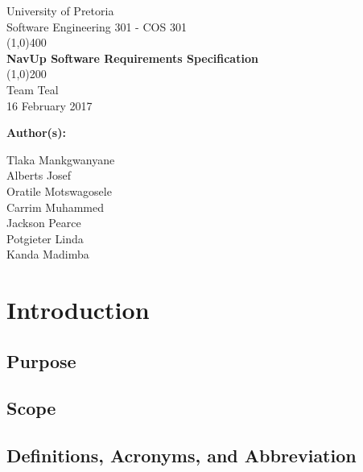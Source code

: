 \documentclass[12pt, a4paper]{article}
\begin{document}
\begin{titlepage}
	\begin{center}
	\huge{University of Pretoria\\
	Software Engineering 301 - COS 301}\\
	\line(1,0){400}\\
	\huge{\bfseries NavUp Software Requirements Specification}\\
	\line(1,0){200}\\
	Team Teal\\
	16 February 2017\\
	[3cm]
	\end{center}
	\begin{flushleft}
	\bfseries{Author(s):}
	\end{flushleft}
	\begin{flushleft}
	Tlaka Mankgwanyane	\\
	Alberts Josef			\\
	Oratile Motswagosele	\\
	Carrim Muhammed		\\
	Jackson Pearce			\\
	Potgieter Linda		\\
	Kanda Madimba			\\
	\end{flushleft}
\end{titlepage}

\tableofcontents

\section{Introduction}
	\subsection{Purpose}
	\subsection{Scope}
	\subsection{Definitions, Acronyms, and Abbreviation}
\end{document}
